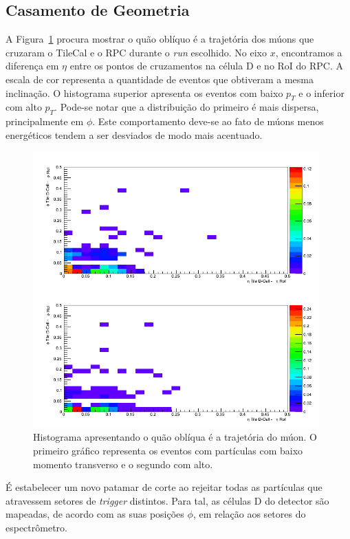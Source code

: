 \subsection*{Casamento de Geometria}

A Figura~\ref{crossgeo} procura mostrar o quão oblíquo é a trajetória dos múons
que cruzaram o TileCal e o RPC durante o \emph{run} escolhido. No eixo $x$,
encontramos a diferença em $\eta$ entre os pontos de cruzamentos na célula D e
no RoI do RPC. A escala de cor representa a quantidade de eventos que obtiveram
a mesma inclinação. O histograma superior apresenta os eventos com baixo $p_T$ e
o inferior com alto $p_T$. Pode-se notar que a distribuição do primeiro é mais
dispersa, principalmente em $\phi$. Este comportamento deve-se ao fato de múons
menos energéticos tendem a ser desviados de modo mais acentuado.

\begin{figure}[htpb!]
    \centering
    \includegraphics[width=11cm]{images/sglmuon/crossGeo.png}
    \caption{Histograma apresentando o quão oblíqua é a trajetória do múon. O
    primeiro gráfico representa os eventos com partículas com baixo momento
    transverso e o segundo com alto.}
    \label{crossgeo}
\end{figure}

É estabelecer um novo patamar de corte ao rejeitar todas as partículas que
atravessem  setores de \emph{trigger} distintos. Para tal, as células D do
detector são mapeadas, de acordo com as suas posições $\phi$, em relação aos
setores do espectrômetro.

